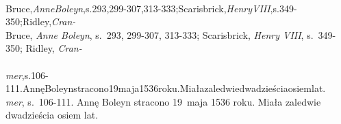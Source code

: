 \documentclass[a4paper,11pt]{article}
\begin{document}
\begin{center}
\begin{tabular}{|c|c|c|c|c|}
    \hline
  \end{tabular}

\end{center}

\vspace{\spaceTwo}


\noindent
{} \\
\Jest Bruce,\textit{AnneBoleyn},s.293,299-307,313-333;Scarisbrick,\textit{HenryVIII},s.349-350;Ridley,\textit{Cran-} \\
\Powin Bruce, \textit{Anne Boleyn}, s.~293, 299-307, 313-333; Scarisbrick,
\textit{Henry VIII}, s.~349-350; Ridley, \textit{Cran-} \\
 \\
\Jest
\textit{mer},s.106-111.AnnęBoleynstracono19maja1536roku.Miałazaledwiedwadzieściaosiemlat. \\
\Powin \textit{mer}, s.~106-111. Annę Boleyn stracono 19~maja 1536 roku.
Miała zaledwie dwadzieścia osiem lat. \\












\newpage

\end{document}

